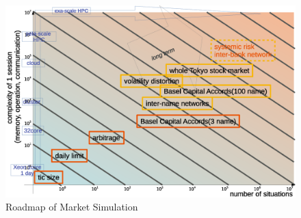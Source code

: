 \begin{figure}
  \centering
  \includegraphics[width=.98\linewidth]{Figs.noda/figure2-6.eps}
  \caption{Roadmap of Market Simulation}
  \label{fig:Figure-6}
\end{figure}



